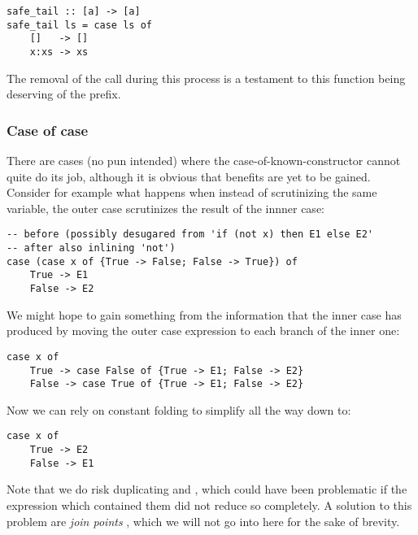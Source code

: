 \begin{listing}[H]
\begin{verbatim}
safe_tail :: [a] -> [a]
safe_tail ls = case ls of
    []   -> []
    x:xs -> xs
\end{verbatim}
\end{listing}

The removal of the call  during this process is a testament to this function being deserving of the  prefix.

\subsubsection{Case of case}

There are cases (no pun intended) where the case-of-known-constructor cannot quite do its job, although it is obvious
that benefits are yet to be gained. Consider for example what happens when instead of scrutinizing the same variable,
the outer case scrutinizes the result of the innner case:


\begin{listing}[H]
\begin{verbatim}
-- before (possibly desugared from 'if (not x) then E1 else E2'
-- after also inlining 'not')
case (case x of {True -> False; False -> True}) of
    True -> E1
    False -> E2
\end{verbatim}
\end{listing}

We might hope to gain something from the information that the inner case has produced by moving the outer case expression
to each branch of the inner one:

\begin{listing}[H]
\begin{verbatim}
case x of
    True -> case False of {True -> E1; False -> E2}
    False -> case True of {True -> E1; False -> E2}
\end{verbatim}
\end{listing}

Now we can rely on constant folding to simplify all the way down to:

\begin{listing}[H]
\begin{verbatim}
case x of
    True -> E2
    False -> E1
\end{verbatim}
\end{listing}

Note that we do risk duplicating  and , which could have been problematic if the expression
which contained them did not reduce so completely.
A solution to this problem are \textit{join points} \cite{compiling_wo_continuations},
which we will not go into here for the sake of brevity.

